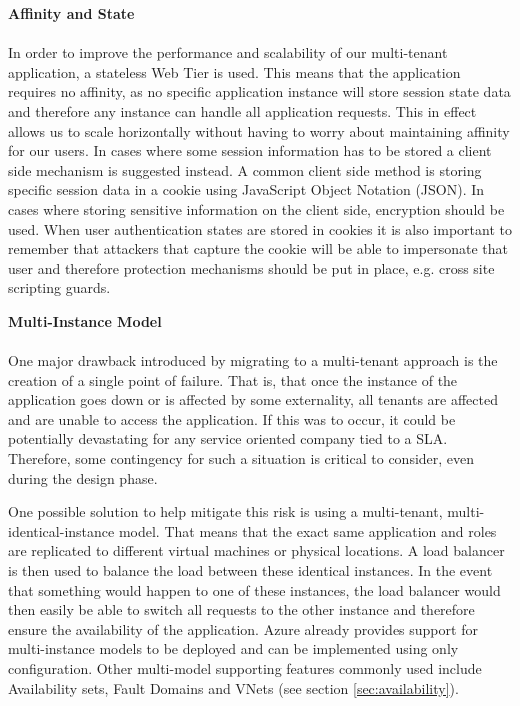 \textbf{Affinity and State}
\\
\\
In order to improve the performance and scalability of our multi-tenant application, a stateless Web Tier is used. This means that the application requires no affinity, as no specific application instance will store session state data and therefore any instance can handle all application requests. This in effect allows us to scale horizontally without having to worry about maintaining affinity for our users. In cases where some session information has to be stored a client side mechanism is suggested instead. A common client side method is storing specific session data in a cookie using JavaScript Object Notation (JSON). In cases where storing sensitive information on the client side, encryption should be used. When user authentication states are stored in cookies it is also important to remember that attackers that capture the cookie will be able to impersonate that user and therefore protection mechanisms should be put in place, e.g. cross site scripting guards.


\textbf{Multi-Instance Model}
\\
\\
\label{sec:multiinstance}
One major drawback introduced by migrating to a multi-tenant approach is the creation of a single point of failure. That is, that once the instance of the application goes down or is affected by some externality, all tenants are affected and are unable to access the application. If this was to occur, it could be potentially devastating for any service oriented company tied to a SLA. Therefore, some contingency for such a situation is critical to consider, even during the design phase.
 
One possible solution to help mitigate this risk is using a multi-tenant, multi-identical-instance model. That means that the exact same application and roles are replicated to different virtual machines or physical locations. A load balancer is then used to balance the load between these identical instances. In the event that something would happen to one of these instances, the load balancer would then easily be able to switch all requests to the other instance and therefore ensure the availability of the application. Azure already provides support for multi-instance models to be deployed and can be implemented using only configuration. Other multi-model supporting features commonly used include Availability sets, Fault Domains and VNets (see section \ref{sec:availability}).


